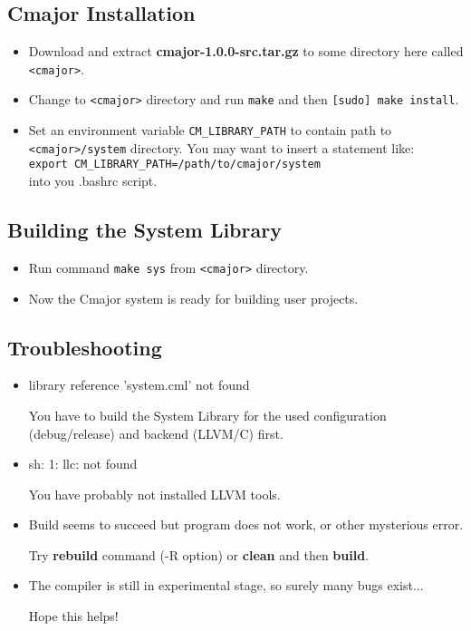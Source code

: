 \documentclass[oneside, a4paper, 11pt]{article}
\begin{document}
\subsection{Cmajor Installation}

\begin{itemize}

\item
Download and extract \textbf{cmajor-1.0.0-src.tar.gz} to some directory here called \verb|<cmajor>|.

\item
Change to \verb|<cmajor>| directory and run \verb|make| and then \verb|[sudo] make install|.

\item
Set an environment variable \verb|CM_LIBRARY_PATH| to contain path to \verb|<cmajor>/system| directory.
You may want to insert a statement like:\\
\verb|export CM_LIBRARY_PATH=/path/to/cmajor/system|\\
into you .bashrc script.

\end{itemize}

\subsection{Building the System Library}

\begin{itemize}

\item
Run command \verb|make sys| from \verb|<cmajor>| directory.

\item
Now the Cmajor system is ready for building user projects.

\end{itemize}

\subsection{Troubleshooting}

\begin{itemize}

\item
library reference 'system.cml' not found

You have to build the System Library for the used configuration (debug/release) and backend (LLVM/C) first.

\item
sh: 1: llc: not found

You have probably not installed LLVM tools.

\item
Build seems to succeed but program does not work, or other mysterious error.

Try \textbf{rebuild} command (-R option) or \textbf{clean} and then \textbf{build}.

\item
The compiler is still in experimental stage, so surely many bugs exist...

Hope this helps!
\end{itemize}
\end{document}
